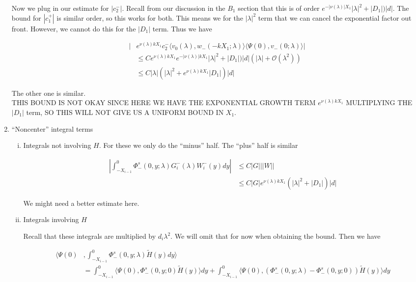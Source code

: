 \documentclass[12pt]{article}
\begin{document}
\begin{enumerate}
Now we plug in our estimate for $|c_2^-|$. Recall from our discussion in the $B_1$ section that this is of order $e^{-|\nu(\lambda)|X_1} |\lambda|^2 + |D_1|) |d|$. The bound for $|c_1^+|$ is similar order, so this works for both. This means we for the $|\lambda|^2$ term that we can cancel the exponential factor out front. However, we cannot do this for the $|D_1|$ term. Thus we have

\begin{align*}
|&e^{\nu(\lambda)k X_1} c_2^- \langle v_0(\lambda), w_-(-k X_1; \lambda) \rangle \langle \Psi(0), v_-(0; \lambda) \rangle| \\
&\leq C e^{\nu(\lambda)k X_1} e^{-|\nu(\lambda)|k X_1} |\lambda|^2 + |D_1|) |d| (|\lambda| + \mathcal{O}(\lambda^2) ) \\
&\leq C |\lambda| (|\lambda|^2 + e^{\nu(\lambda)k X_1} |D_1|)|d|
\end{align*}

The other one is similar.\\

THIS BOUND IS NOT OKAY SINCE HERE WE HAVE THE EXPONENTIAL GROWTH TERM $e^{\nu(\lambda)k X_1}$ MULTIPLYING THE $|D_1|$ term, SO THIS WILL NOT GIVE US A UNIFORM BOUND IN $X_1$.

\item ``Noncenter'' integral terms

\begin{enumerate}[(i)]

\item Integrals not involving $H$. For these we only do the ``minus'' half. The ``plus'' half is similar

\begin{align*}
\left| \int_{-X_{i-1}}^0 \Phi^s_-(0, y; \lambda) G_i^-(\lambda)W_i^-(y) dy \right| 
&\leq C |G| ||W|| \\
&\leq C |G| e^{\nu(\lambda)k X_1} ( |\lambda|^2 + |D_1| )|d|
\end{align*}

We might need a better estimate here.

\item Integrals involving $H$

Recall that these integrals are multiplied by $d_i \lambda^2$. We will omit that for now when obtaining the bound. Then we have

\begin{align*}
\langle \Psi(0)&, \int_{-X_{i-1}}^0 \Phi^s_-(0, y; \lambda) \tilde{H}(y) dy \rangle \\ 
&= \int_{-X_{i-1}}^0 \langle \Psi(0), \Phi^s_-(0, y; 0) \tilde{H}(y) \rangle dy + 
\int_{-X_{i-1}}^0 \langle \Psi(0), (\Phi^s_-(0, y; \lambda) - \Phi^s_-(0, y; 0)) \tilde{H}(y) \rangle dy
\end{align*}


\end{enumerate}
\end{enumerate}
\end{document}
